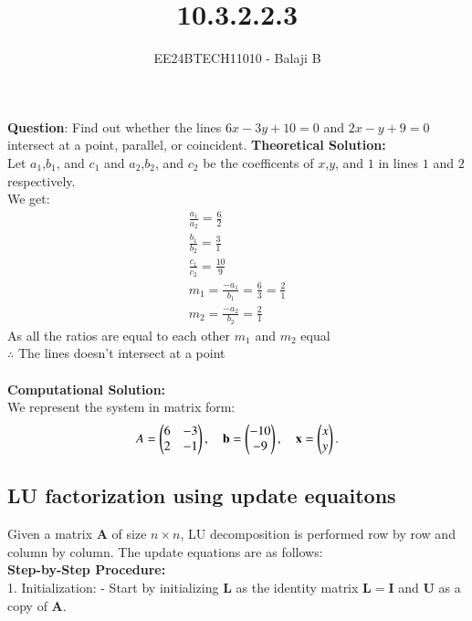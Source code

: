 \documentclass[journal]{IEEEtran}
\begin{document}

\vspace{3cm}

\title{10.3.2.2.3}
\author{EE24BTECH11010 - Balaji B}
{\let\newpage\relax\maketitle}

\renewcommand{\thefigure}{\theenumi}
\renewcommand{\thetable}{\theenumi}
\setlength{\intextsep}{10pt} %


\renewcommand{\thetable}{\theenumi}


\textbf{Question}:\newline
Find out whether the lines $6x-3y+10=0$ and $2x-y+9=0$ intersect at a point, parallel, or coincident. 
\newline
\textbf{Theoretical Solution:}\\
Let $a_1$,$b_1$, and $c_1$ and $a_2$,$b_2$, and $c_2$ be the coefficents of $x$,$y$, and $1$ in lines $1$ and $2$ respectively.\\
We get:
\begin{align}
    \frac{a_1}{a_2}=\frac{6}{2}\\
    \frac{b_1}{b_2}=\frac{3}{1}\\
    \frac{c_1}{c_2}=\frac{10}{9}\\
    m_1=\frac{-a_1}{b_1}=\frac{6}{3} = \frac{2}{1}\\
    m_2=\frac{-a_2}{b_2}=\frac{2}{1}
\end{align}
As all the ratios are equal to each other $m_1$ and $m_2$ equal\\
$\therefore$ The lines doesn't intersect at a point\\\\
\textbf{Computational Solution:}\\
We represent the system in matrix form:
\begin{align}
A = \begin{pmatrix}6& -3 \\ 2 & -1\end{pmatrix}, \quad
\mathbf{b} = \begin{pmatrix}-10 \\ -9\end{pmatrix}, \quad
\mathbf{x} = \begin{pmatrix}x \\ y\end{pmatrix}.
\end{align}

\subsection*{LU factorization using update equaitons}
    Given a matrix $ \mathbf{A} $ of size $ n \times n $, LU decomposition is performed row by row and column by column. The update equations are as follows:\\
    \textbf{Step-by-Step Procedure:}\\
1. Initialization: 
   - Start by initializing $ \mathbf{L} $ as the identity matrix $ \mathbf{L} = \mathbf{I} $ and $ \mathbf{U} $ as a copy of $ \mathbf{A} $.
   
\end{document}

